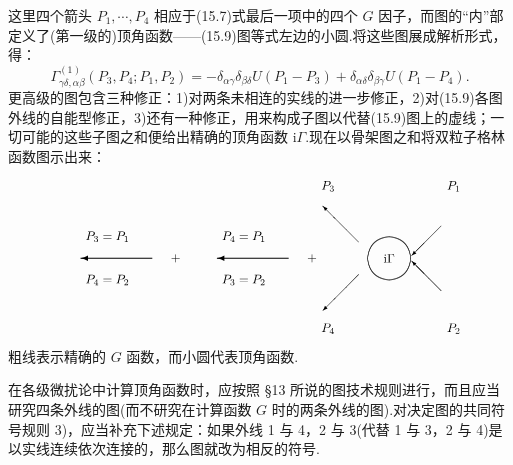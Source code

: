 这里四个箭头 $P_1,\cdots,P_4$ 相应于(15.7)式最后一项中的四个 $G$ 因子，而图的“内”部定义了(第一级的)顶角函数——(15.9)图等式左边的小圆.将这些图展成解析形式，得：
\begin{equation*}
  \Gamma^{(1)}_{\gamma\delta,\alpha\beta}(P_3,P_4;P_1,P_2)
  =-\delta_{\alpha\gamma}\delta_{\beta\delta}U(P_1-P_3)
  +\delta_{\alpha\delta}\delta_{\beta\gamma}U(P_1-P_4).
\end{equation*}
更高级的图包含三种修正：1)对两条未相连的实线的进一步修正，2)对(15.9)各图外线的自能型修正，3)还有一种修正，用来构成子图以代替(15.9)图上的虚线；一切可能的这些子图之和便给出精确的顶角函数 $\mathrm{i}\Gamma$.现在以骨架图之和将双粒子格林函数图示出来：
\begin{equation}
  \setlength{\unitlength}{0.72pt}%
  \begin{picture}(560,175)(0,0)
    \put(110,106){\makebox(0,0){$P_3=P_1$}}%
    \tarrL{160}{82}{80}%
    \put(110,58){\makebox(0,0){$P_4=P_2$}}%
    \put(186,82){\makebox(0,0){$+$}}%
    \put(262,106){\makebox(0,0){$P_4=P_1$}}%
    \tarrL{312}{82}{80}%
    \put(262,58){\makebox(0,0){$P_3=P_2$}}%
    \put(338,82){\makebox(0,0){$+$}}%
    \put(390,100){\vector(-1,1){40}}%
    \put(390,64){\vector(-1,-1){40}}%
    \qbezier(424,58)(445.936,60.064)(448,82)%
    \qbezier(448,82)(445.936,103.936)(424,106)%
    \qbezier(424,106)(402.064,103.936)(400,82)%
    \qbezier(400,82)(402.064,60.064)(424,58)%
    \put(424,82){\makebox(0,0){$\mathrm{i}\Gamma$}}%
    \put(482,118){\vector(-1,-1){33}}%
    \put(482,46){\vector(-1,1){33}}%
    \put(356,162){\makebox(0,0){$P_3$}}%
    \put(496,162){\makebox(0,0){$P_1$}}%
    \put(356,4){\makebox(0,0){$P_4$}}%
    \put(496,4){\makebox(0,0){$P_2$}}%
  \end{picture}
\end{equation}
粗线表示精确的 $G$ 函数，而小圆代表顶角函数.

在各级微扰论中计算顶角函数时，应按照 §13 所说的图技术规则进行，而且应当研究四条外线的图(而不研究在计算函数 $G$ 时的两条外线的图).对决定图的共同符号规则 3)，应当补充下述规定：如果外线 1 与 4，2 与 3(代替 1 与 3，2 与 4)是以实线连续依次连接的，那么图就改为相反的符号.


